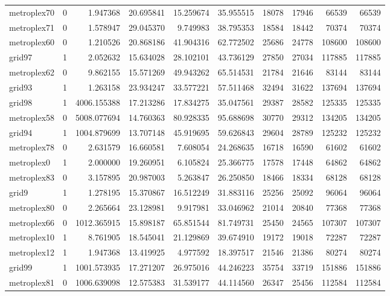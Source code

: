 \begin{longtable}{|l|r|r|r|r|r|r|r|r|r|}
metroplex70 & 0 & 1.947368 & 20.695841 & 15.259674 & 35.955515 & 18078 & 17946 & 66539 & 66539 \\
metroplex71 & 0 & 1.578947 & 29.045370 & 9.749983 & 38.795353 & 18584 & 18442 & 70374 & 70374 \\
metroplex60 & 0 & 1.210526 & 20.868186 & 41.904316 & 62.772502 & 25686 & 24778 & 108600 & 108600 \\
grid97 & 1 & 2.052632 & 15.634028 & 28.102101 & 43.736129 & 27850 & 27034 & 117885 & 117885 \\
metroplex62 & 0 & 9.862155 & 15.571269 & 49.943262 & 65.514531 & 21784 & 21646 & 83144 & 83144 \\
grid93 & 1 & 1.263158 & 23.934247 & 33.577221 & 57.511468 & 32494 & 31622 & 137694 & 137694 \\
grid98 & 1 & 4006.155388 & 17.213286 & 17.834275 & 35.047561 & 29387 & 28582 & 125335 & 125335 \\
metroplex58 & 0 & 5008.077694 & 14.760363 & 80.928335 & 95.688698 & 30770 & 29312 & 134205 & 134205 \\
grid94 & 1 & 1004.879699 & 13.707148 & 45.919695 & 59.626843 & 29604 & 28789 & 125232 & 125232 \\
metroplex78 & 0 & 2.631579 & 16.660581 & 7.608054 & 24.268635 & 16718 & 16590 & 61602 & 61602 \\
metroplex0 & 1 & 2.000000 & 19.260951 & 6.105824 & 25.366775 & 17578 & 17448 & 64862 & 64862 \\
metroplex83 & 0 & 3.157895 & 20.987003 & 5.263847 & 26.250850 & 18466 & 18334 & 68128 & 68128 \\
grid9 & 1 & 1.278195 & 15.370867 & 16.512249 & 31.883116 & 25256 & 25092 & 96064 & 96064 \\
metroplex80 & 0 & 2.265664 & 23.128981 & 9.917981 & 33.046962 & 21014 & 20840 & 77368 & 77368 \\
metroplex66 & 0 & 1012.365915 & 15.898187 & 65.851544 & 81.749731 & 25450 & 24565 & 107307 & 107307 \\
metroplex10 & 1 & 8.761905 & 18.545041 & 21.129869 & 39.674910 & 19172 & 19018 & 72287 & 72287 \\
metroplex12 & 1 & 1.947368 & 13.419925 & 4.977592 & 18.397517 & 21546 & 21386 & 80274 & 80274 \\
grid99 & 1 & 1001.573935 & 17.271207 & 26.975016 & 44.246223 & 35754 & 33719 & 151886 & 151886 \\
metroplex81 & 0 & 1006.639098 & 12.575383 & 31.539177 & 44.114560 & 26347 & 25456 & 112584 & 112584 \\

\end{longtable}

